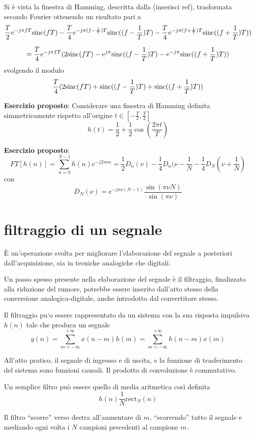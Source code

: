 
\section{}
Si è vista la finestra di Hamming, descritta dalla (inserisci ref), trasformata
secondo Fourier ottenendo un risultato pari a
$$
\frac{T}{2}e^{-j\pi fT}\text{sinc}(fT) - \frac{T}{4}e^{-j\pi (f-\frac{1}{T})T}
\text{sinc}((f-\frac{1}{T})T) - \frac{T}{4}e^{-j\pi(f+\frac{1}{T})T}
\text{sinc}((f+\frac{1}{T})T))
$$

$$
= \frac{T}{4}e^{-j\pi fT}
(2\text{sinc}(fT)-e^{j\pi}\text{sinc}((f-\frac{1}{T})T) -
e^{-j\pi}\text{sinc}((f+\frac{1}{T})T))
$$
svolgendo il modulo
$$
\frac{T}{4}(2\text{sinc}(fT)+\text{sinc}((f-\frac{1}{T})T) +
\text{sinc}((f+\frac{1}{T})T))
$$

\textbf{Esercizio proposto}: Considerare una finestra di Hamming definita
simmetricamente rispetto all'origine $t \in [-\frac{T}{2},\frac{T}{2}]$
$$
h(t) = \frac{1}{2} + \frac{1}{2}\cos(\frac{2\pi t}{T})
$$

\textbf{Esercizio proposto}:
$$
FT[h(n)] = \sum_{n=0}^{N-1} h(n)e^{-j2\pi \nu n} = \frac{1}{2} D_n (\nu)
-\frac{1}{4} D_n (\nu - \frac{1}{N} - \frac{1}{4} D_N(\nu+\frac{1}{N})
$$
con
$$
D_N(\nu) = e^{-j\pi \nu (N-1)} \frac{\sin(\pi \nu N)}{\sin(\pi \nu)}
$$

\section{filtraggio di un segnale}
È un'operazione svolta per migliorare l'elaborazione del segnale a posteriori
dall'acquisizione, sia in tecniche analogiche che digitali.

Un passo spesso presente nella elaborazione del segnale è il filtraggio,
finalizzato alla riduzione del rumore, potrebbe essere inserito dall'atto
stesso della conversione analogica-digitale, anche introdotto dal convertitore
stesso.

Il filtraggio pu`o essere rappresentato da un sistema con la sua risposta
impulsiva $h(n)$ tale che produca un segnale
$$y(n) =
\sum_{m=-\infty}^{+\infty}x(n-m)h(m) = \sum_{m=-\infty}^{+\infty}h(n-m)x(m)
$$

All'atto pratico, il segnale di ingresso e di uscita, e la funzione di
trasferimento del sistema sono funzioni causali. Il prodotto di
convoluzione è commutativo.

Un semplice filtro può essere quello di media aritmetica così definita
$$
h(n) \frac{1}{N} \text{rect}_N(n)
$$


Il filtro ``scorre'' verso destra all'aumentare di $m$, ``scorrendo'' tutto il
segnale e mediando ogni volta i $N$ campioni precedenti al campione $m$.




